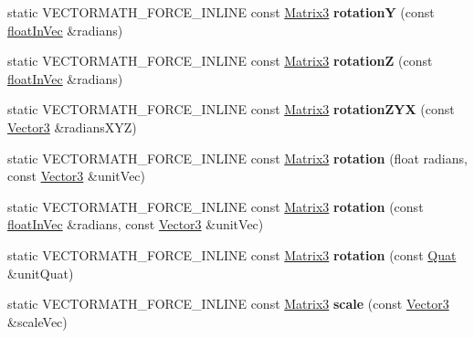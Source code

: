 \begin{DoxyCompactItemize}
static V\+E\+C\+T\+O\+R\+M\+A\+T\+H\+\_\+\+F\+O\+R\+C\+E\+\_\+\+I\+N\+L\+I\+NE const \hyperlink{classVectormath_1_1Aos_1_1Matrix3}{Matrix3} {\bfseries rotationY} (const \hyperlink{classVectormath_1_1floatInVec}{float\+In\+Vec} \&radians)
\item 
\mbox{\label{classVectormath_1_1Aos_1_1Matrix3_ad9719b8ac683c280ef797f2192fd7b00}} 
static V\+E\+C\+T\+O\+R\+M\+A\+T\+H\+\_\+\+F\+O\+R\+C\+E\+\_\+\+I\+N\+L\+I\+NE const \hyperlink{classVectormath_1_1Aos_1_1Matrix3}{Matrix3} {\bfseries rotationZ} (const \hyperlink{classVectormath_1_1floatInVec}{float\+In\+Vec} \&radians)
\item 
\mbox{\label{classVectormath_1_1Aos_1_1Matrix3_a52ce43d108608ab358db15b80020af20}} 
static V\+E\+C\+T\+O\+R\+M\+A\+T\+H\+\_\+\+F\+O\+R\+C\+E\+\_\+\+I\+N\+L\+I\+NE const \hyperlink{classVectormath_1_1Aos_1_1Matrix3}{Matrix3} {\bfseries rotation\+Z\+YX} (const \hyperlink{classVectormath_1_1Aos_1_1Vector3}{Vector3} \&radians\+X\+YZ)
\item 
\mbox{\label{classVectormath_1_1Aos_1_1Matrix3_a0a03cea9ec13b69af30adb7aed9550a8}} 
static V\+E\+C\+T\+O\+R\+M\+A\+T\+H\+\_\+\+F\+O\+R\+C\+E\+\_\+\+I\+N\+L\+I\+NE const \hyperlink{classVectormath_1_1Aos_1_1Matrix3}{Matrix3} {\bfseries rotation} (float radians, const \hyperlink{classVectormath_1_1Aos_1_1Vector3}{Vector3} \&unit\+Vec)
\item 
\mbox{\label{classVectormath_1_1Aos_1_1Matrix3_a9007436ccc9ec0a63f6527ec89fc9a05}} 
static V\+E\+C\+T\+O\+R\+M\+A\+T\+H\+\_\+\+F\+O\+R\+C\+E\+\_\+\+I\+N\+L\+I\+NE const \hyperlink{classVectormath_1_1Aos_1_1Matrix3}{Matrix3} {\bfseries rotation} (const \hyperlink{classVectormath_1_1floatInVec}{float\+In\+Vec} \&radians, const \hyperlink{classVectormath_1_1Aos_1_1Vector3}{Vector3} \&unit\+Vec)
\item 
\mbox{\label{classVectormath_1_1Aos_1_1Matrix3_a1089e04865b25cfecd7f822e98c47aaa}} 
static V\+E\+C\+T\+O\+R\+M\+A\+T\+H\+\_\+\+F\+O\+R\+C\+E\+\_\+\+I\+N\+L\+I\+NE const \hyperlink{classVectormath_1_1Aos_1_1Matrix3}{Matrix3} {\bfseries rotation} (const \hyperlink{classVectormath_1_1Aos_1_1Quat}{Quat} \&unit\+Quat)
\item 
\mbox{\label{classVectormath_1_1Aos_1_1Matrix3_a5499db3c15a95382e7e79021e15af4a8}} 
static V\+E\+C\+T\+O\+R\+M\+A\+T\+H\+\_\+\+F\+O\+R\+C\+E\+\_\+\+I\+N\+L\+I\+NE const \hyperlink{classVectormath_1_1Aos_1_1Matrix3}{Matrix3} {\bfseries scale} (const \hyperlink{classVectormath_1_1Aos_1_1Vector3}{Vector3} \&scale\+Vec)
\end{DoxyCompactItemize}


